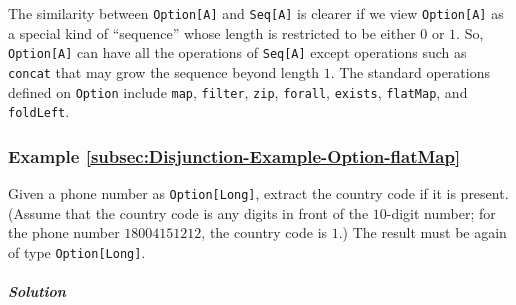 The similarity between \lstinline!Option[A]! and \lstinline!Seq[A]!
is clearer if we view \lstinline!Option[A]! as a special kind of
``sequence'' whose length is restricted to be either $0$ or $1$.
So, \lstinline!Option[A]! can have all the operations of \lstinline!Seq[A]!
except operations such as \lstinline!concat! that may grow the sequence
beyond length $1$. The standard operations defined on \lstinline!Option!
include \lstinline!map!, \lstinline!filter!, \lstinline!zip!, \lstinline!forall!,
\lstinline!exists!, \lstinline!flatMap!, and \lstinline!foldLeft!.

\subsubsection{Example \label{subsec:Disjunction-Example-Option-flatMap}\ref{subsec:Disjunction-Example-Option-flatMap}}

Given a phone number as \lstinline!Option[Long]!, extract the country
code if it is present. (Assume that the country code is any digits
in front of the $10$-digit number; for the phone number $18004151212$,
the country code is $1$.) The result must be again of type \lstinline!Option[Long]!.

\subparagraph{Solution}

